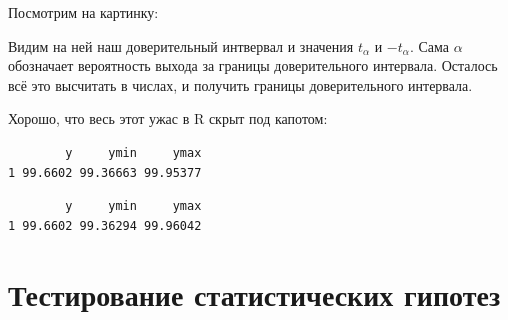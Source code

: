 \documentclass[
  letterpaper,
  DIV=11,
  numbers=noendperiod]{scrreprt}
\newenvironment{Shaded}{}{}
\newcommand{\FunctionTok}[1]{\textcolor[rgb]{0.44,0.26,0.76}{#1}}
\newcommand{\NormalTok}[1]{\textcolor[rgb]{0.14,0.16,0.18}{#1}}
\newcommand{\SpecialCharTok}[1]{\textcolor[rgb]{0.00,0.36,0.77}{#1}}
\newcommand{\const}{\text{const}}
\newcommand{\lp}{\left(}
\newcommand{\rp}{\right)}
\newcommand{\lb}{\left[}
\newcommand{\rb}{\right]}
\newcommand*\circled[1]{\tikz[baseline=(char.base)]{
            \node[shape=circle,draw,inner sep=2pt] (char) {#1};}}
\newcommand{\xor}{\,\text{XOR}\,}
\newcommand{\setN}{\mathbb{N}}
\newcommand{\setNo}{\mathbb{N}_{0}}
\newcommand{\setZ}{\mathbb{Z}}
\newcommand{\setQ}{\mathbb{Q}}
\newcommand{\setR}{\mathbb{R}}
\newcommand{\setC}{\mathbb{C}}
\theoremstyle{definition}
\theoremstyle{remark}
\begin{document}
Посмотрим на картинку:

Видим на ней наш доверительный интвервал и значения \(t_\alpha\) и
\(-t_\alpha\). Сама \(\alpha\) обозначает вероятность выхода за границы
доверительного интервала. Осталось всё это высчитать в числах, и
получить границы доверительного интервала.

Хорошо, что весь этот ужас в R скрыт под капотом:

\begin{Shaded}
\end{Shaded}

\begin{verbatim}
        y     ymin     ymax
1 99.6602 99.36663 99.95377
\end{verbatim}

\begin{Shaded}
\end{Shaded}

\begin{verbatim}
        y     ymin     ymax
1 99.6602 99.36294 99.96042
\end{verbatim}


\chapter{Тестирование статистических гипотез}\label{stats-testing}

\usepackage{xcolor}
\usepackage{soul}
\usepackage{amsmath, amsfonts}

\newcommand{\const}{\text{const}}
\newcommand{\lp}{\left(}
\newcommand{\rp}{\right)}
\newcommand{\lb}{\left[}
\newcommand{\rb}{\right]}

\newcommand*\circled[1]{\tikz[baseline=(char.base)]{
            \node[shape=circle,draw,inner sep=2pt] (char) {#1};}}

\newcommand{\xor}{\,\text{XOR}\,}

\newcommand{\setN}{\mathbb{N}}
\newcommand{\setNo}{\mathbb{N}_{0}}
\newcommand{\setZ}{\mathbb{Z}}
\newcommand{\setQ}{\mathbb{Q}}
\newcommand{\setR}{\mathbb{R}}
\newcommand{\setC}{\mathbb{C}}
\end{document}
